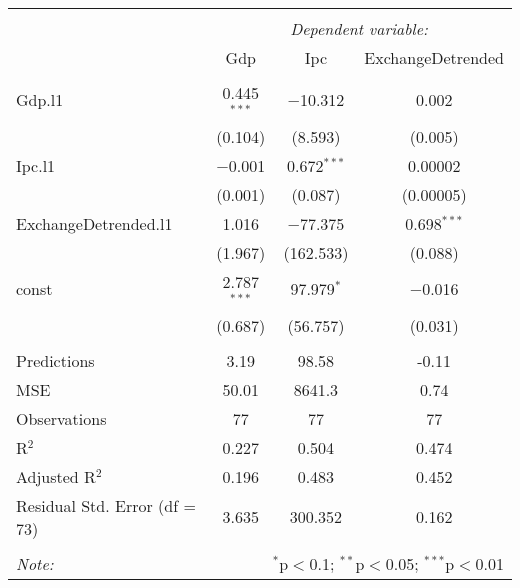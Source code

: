 
\begin{table}[H] \centering 
  \caption{} 
  \label{tb:var_1} 
\begin{tabular}{@{\extracolsep{5pt}}lccc} 
\\[-1.8ex]\hline 
\hline \\[-1.8ex] 
 & \multicolumn{3}{c}{\textit{Dependent variable:}} \\ 
\cline{2-4} 
 & Gdp & Ipc & ExchangeDetrended \\ 
\hline \\[-1.8ex] 
 Gdp.l1 & 0.445$^{***}$ & $-$10.312 & 0.002 \\ 
  & (0.104) & (8.593) & (0.005) \\ 
  Ipc.l1 & $-$0.001 & 0.672$^{***}$ & 0.00002 \\ 
  & (0.001) & (0.087) & (0.00005) \\ 
  ExchangeDetrended.l1 & 1.016 & $-$77.375 & 0.698$^{***}$ \\ 
  & (1.967) & (162.533) & (0.088) \\ 
  const & 2.787$^{***}$ & 97.979$^{*}$ & $-$0.016 \\ 
  & (0.687) & (56.757) & (0.031) \\ 
 \hline \\[-1.8ex] 
Predictions & 3.19 & 98.58 & -0.11 \\ 
MSE & 50.01 & 8641.3 & 0.74 \\ 
Observations & 77 & 77 & 77 \\ 
R$^{2}$ & 0.227 & 0.504 & 0.474 \\ 
Adjusted R$^{2}$ & 0.196 & 0.483 & 0.452 \\ 
Residual Std. Error (df = 73) & 3.635 & 300.352 & 0.162 \\ 
\hline 
\hline \\[-1.8ex] 
\textit{Note:}  & \multicolumn{3}{r}{$^{*}$p$<$0.1; $^{**}$p$<$0.05; $^{***}$p$<$0.01} \\ 
\end{tabular} 
\end{table} 
